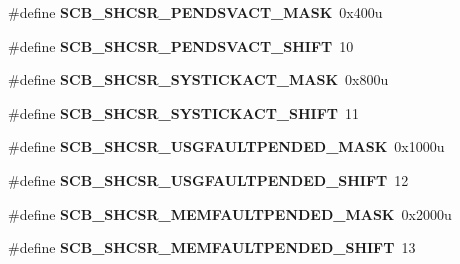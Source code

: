 \begin{DoxyCompactItemize}
\item 
\hypertarget{group___s_c_b___register___masks_gaffc1ee0d5d037f3a6ae6fad47890923a}{}\#define {\bfseries S\+C\+B\+\_\+\+S\+H\+C\+S\+R\+\_\+\+P\+E\+N\+D\+S\+V\+A\+C\+T\+\_\+\+M\+A\+S\+K}~0x400u\label{group___s_c_b___register___masks_gaffc1ee0d5d037f3a6ae6fad47890923a}

\item 
\hypertarget{group___s_c_b___register___masks_ga4831654e5a96b972c21780a9ec39c0c9}{}\#define {\bfseries S\+C\+B\+\_\+\+S\+H\+C\+S\+R\+\_\+\+P\+E\+N\+D\+S\+V\+A\+C\+T\+\_\+\+S\+H\+I\+F\+T}~10\label{group___s_c_b___register___masks_ga4831654e5a96b972c21780a9ec39c0c9}

\item 
\hypertarget{group___s_c_b___register___masks_gab572262963ad32ea34194837f4911dd8}{}\#define {\bfseries S\+C\+B\+\_\+\+S\+H\+C\+S\+R\+\_\+\+S\+Y\+S\+T\+I\+C\+K\+A\+C\+T\+\_\+\+M\+A\+S\+K}~0x800u\label{group___s_c_b___register___masks_gab572262963ad32ea34194837f4911dd8}

\item 
\hypertarget{group___s_c_b___register___masks_gad69c0a12186ae2d9fc8e9b07d0ca4690}{}\#define {\bfseries S\+C\+B\+\_\+\+S\+H\+C\+S\+R\+\_\+\+S\+Y\+S\+T\+I\+C\+K\+A\+C\+T\+\_\+\+S\+H\+I\+F\+T}~11\label{group___s_c_b___register___masks_gad69c0a12186ae2d9fc8e9b07d0ca4690}

\item 
\hypertarget{group___s_c_b___register___masks_ga77527df58470c4d468aa1ce5d5ddb78a}{}\#define {\bfseries S\+C\+B\+\_\+\+S\+H\+C\+S\+R\+\_\+\+U\+S\+G\+F\+A\+U\+L\+T\+P\+E\+N\+D\+E\+D\+\_\+\+M\+A\+S\+K}~0x1000u\label{group___s_c_b___register___masks_ga77527df58470c4d468aa1ce5d5ddb78a}

\item 
\hypertarget{group___s_c_b___register___masks_gaf903cdc17051f0b430ad6650ffc1fb5f}{}\#define {\bfseries S\+C\+B\+\_\+\+S\+H\+C\+S\+R\+\_\+\+U\+S\+G\+F\+A\+U\+L\+T\+P\+E\+N\+D\+E\+D\+\_\+\+S\+H\+I\+F\+T}~12\label{group___s_c_b___register___masks_gaf903cdc17051f0b430ad6650ffc1fb5f}

\item 
\hypertarget{group___s_c_b___register___masks_ga56fa72b27b303242795e69b0f5e4c207}{}\#define {\bfseries S\+C\+B\+\_\+\+S\+H\+C\+S\+R\+\_\+\+M\+E\+M\+F\+A\+U\+L\+T\+P\+E\+N\+D\+E\+D\+\_\+\+M\+A\+S\+K}~0x2000u\label{group___s_c_b___register___masks_ga56fa72b27b303242795e69b0f5e4c207}

\item 
\hypertarget{group___s_c_b___register___masks_gad06bc6a6c902cb462c3bcb14f13c917e}{}\#define {\bfseries S\+C\+B\+\_\+\+S\+H\+C\+S\+R\+\_\+\+M\+E\+M\+F\+A\+U\+L\+T\+P\+E\+N\+D\+E\+D\+\_\+\+S\+H\+I\+F\+T}~13\label{group___s_c_b___register___masks_gad06bc6a6c902cb462c3bcb14f13c917e}


\end{DoxyCompactItemize}
